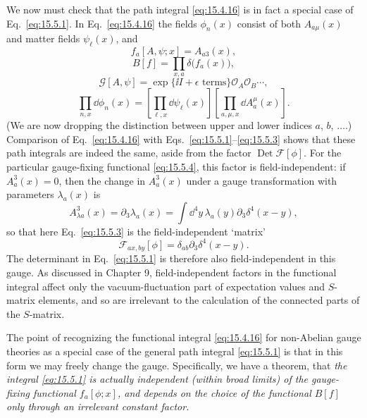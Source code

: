 We now must check that the path integral \eqref{eq:15.4.16} is in fact a
special case of Eq.~\eqref{eq:15.5.1}. In Eq.~\eqref{eq:15.4.16} the fields
$\phi_n(x)$ consist of both $A_{a\mu}(x)$ and matter fields $\psi_\ell(x)$,
and
\begin{equation}
  f_a[A,\psi;x]=A_{a3}(x),
  \tag{15.5.4}\label{eq:15.5.4}
\end{equation}
\begin{equation}
  B[f]=\prod_{x,a}\delta\bigl(f_a(x)\bigr),
  \tag{15.5.5}\label{eq:15.5.5}
\end{equation}
\begin{equation}
  \mathcal G[A,\psi]=\exp\{\ii I+\epsilon\text{ terms}\}
  \mathcal O_A\mathcal O_B\cdots,
  \tag{15.5.6}\label{eq:15.5.6}
\end{equation}
\begin{equation}
  \prod_{n,x}\dd\phi_n(x)
  =\left[\prod_{\ell,x}\dd\psi_\ell(x)\right]
  \left[\prod_{a,\mu,x}\dd A_a^\mu(x)\right].
  \tag{15.5.7}\label{eq:15.5.7}
\end{equation}
(We are now dropping the distinction between upper and lower indices
$a$, $b$, $\ldots$.) Comparison of Eq.~\eqref{eq:15.4.16} with
Eqs.~\eqref{eq:15.5.1}--\eqref{eq:15.5.3} shows that these path integrals are
indeed the same, aside from the factor $\operatorname{Det}\mathcal F[\phi]$.
For the particular gauge-fixing functional \eqref{eq:15.5.4}, this factor is
field-independent: if $A_a^3(x)=0$, then the change in
$A_a^3(x)$ under a gauge transformation with parameters
$\lambda_a(x)$ is
\begin{equation*}
  A_{\lambda a}^3(x)=\partial_3\lambda_a(x)
  =\int \dd^4y\,\lambda_a(y)\partial_3\delta^4(x-y),
\end{equation*}
so that here Eq.~\eqref{eq:15.5.3} is the field-independent `matrix'
\begin{equation*}
  \mathcal F_{a x,b y}[\phi]
  =\delta_{ab}\partial_3\delta^4(x-y).
\end{equation*}
The determinant in Eq.~\eqref{eq:15.5.1} is therefore also field-independent
in this gauge. As discussed in Chapter 9, field-independent factors in the
functional integral affect only the vacuum-fluctuation part of expectation
values and $S$-matrix elements, and so are irrelevant to the calculation of
the connected parts of the $S$-matrix.

The point of recognizing the functional integral \eqref{eq:15.4.16} for
non-Abelian gauge theories as a special case of the general path integral
\eqref{eq:15.5.1} is that in this form we may freely change the gauge.
Specifically, we have a theorem, that \emph{the integral \eqref{eq:15.5.1} is
actually independent (within broad limits) of the gauge-fixing functional
$f_a[\phi;x]$, and depends on the choice of the functional $B[f]$ only
through an irrelevant constant factor.}

